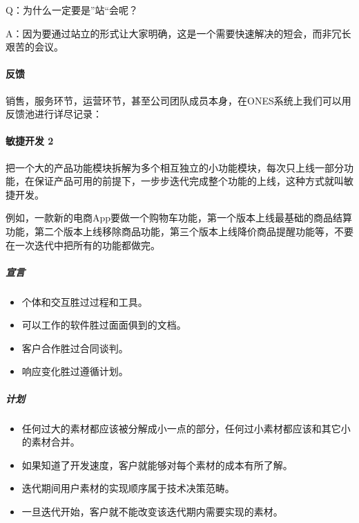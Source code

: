 \documentclass[letterpaper,11pt,english]{sphinxmanual}
\begin{document}
Q：为什么一定要是”站“会呢？

A：因为要通过站立的形式让大家明确，这是一个需要快速解决的短会，而非冗长艰苦的会议。


\paragraph{反馈}
\label{\detokenize{chapter_project/Scrum:id10}}
销售，服务环节，运营环节，甚至公司团队成员本身，在ONES系统上我们可以用反馈池进行详尽记录：


\paragraph{敏捷开发 2\sphinxfootnotemark[742]}
\label{\detokenize{chapter_project/Scrum:id11}}%
\begin{footnotetext}[742]\sphinxAtStartFootnote
{}
%
\end{footnotetext}\ignorespaces 
把一个大的产品功能模块拆解为多个相互独立的小功能模块，每次只上线一部分功能，在保证产品可用的前提下，一步步迭代完成整个功能的上线，这种方式就叫敏捷开发。
%
\begin{footnote}[743]\sphinxAtStartFootnote
{}
%
\end{footnote}

例如，一款新的电商App要做一个购物车功能，第一个版本上线最基础的商品结算功能，第二个版本上线移除商品功能，第三个版本上线降价商品提醒功能等，不要在一次迭代中把所有的功能都做完。


\subparagraph{宣言}
\label{\detokenize{chapter_project/Scrum:id12}}\begin{itemize}
\item {} 
个体和交互胜过过程和工具。

\item {} 
可以工作的软件胜过面面俱到的文档。

\item {} 
客户合作胜过合同谈判。

\item {} 
响应变化胜过遵循计划。

\end{itemize}


\subparagraph{计划}
\label{\detokenize{chapter_project/Scrum:id13}}\begin{itemize}
\item {} 
任何过大的素材都应该被分解成小一点的部分，任何过小素材都应该和其它小的素材合并。

\item {} 
如果知道了开发速度，客户就能够对每个素材的成本有所了解。

\item {} 
迭代期间用户素材的实现顺序属于技术决策范畴。

\item {} 
一旦迭代开始，客户就不能改变该迭代期内需要实现的素材。

\end{itemize}
\end{document}
